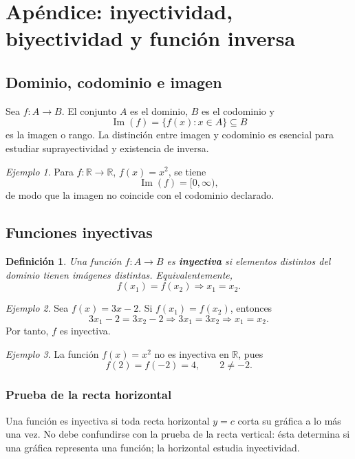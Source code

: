 \documentclass[12pt]{article}
\newtheorem{definicion}{Definición}[section]
\theoremstyle{remark}
\newtheorem{ejemplo}{Ejemplo}[section]
\begin{document}
\appendix
\section{Apéndice: inyectividad, biyectividad y función inversa}
\label{ap:inyectividad-inversa}

\subsection*{Dominio, codominio e imagen}
Sea $f:A\to B$. El conjunto $A$ es el dominio, $B$ es el codominio y
\[
\operatorname{Im}(f)=\{f(x):x\in A\}\subseteq B
\]
es la imagen o rango. La distinción entre imagen y codominio es esencial para estudiar suprayectividad y existencia de inversa.

\begin{ejemplo}
Para $f:\mathbb R\to\mathbb R$, $f(x)=x^2$, se tiene
\[
\operatorname{Im}(f)=[0,\infty),
\]
de modo que la imagen no coincide con el codominio declarado.
\end{ejemplo}
\subsection*{Funciones inyectivas}
\begin{definicion}
Una función $f:A\to B$ es \textbf{inyectiva} si elementos distintos del dominio tienen imágenes distintas. Equivalentemente,
\[
\boxed{f(x_1)=f(x_2)\Longrightarrow x_1=x_2.}
\]
\end{definicion}

\begin{ejemplo}
Sea $f(x)=3x-2$. Si $f(x_1)=f(x_2)$, entonces
\[
3x_1-2=3x_2-2\Longrightarrow 3x_1=3x_2\Longrightarrow x_1=x_2.
\]
Por tanto, $f$ es inyectiva.
\end{ejemplo}

\begin{ejemplo}
La función $f(x)=x^2$ no es inyectiva en $\mathbb R$, pues
\[
f(2)=f(-2)=4,\qquad 2\ne-2.
\]
\end{ejemplo}
\subsubsection*{Prueba de la recta horizontal}
Una función es inyectiva si toda recta horizontal $y=c$ corta su gráfica a lo más una vez. No debe confundirse con la prueba de la recta vertical: ésta determina si una gráfica representa una función; la horizontal estudia inyectividad.
\end{document}
